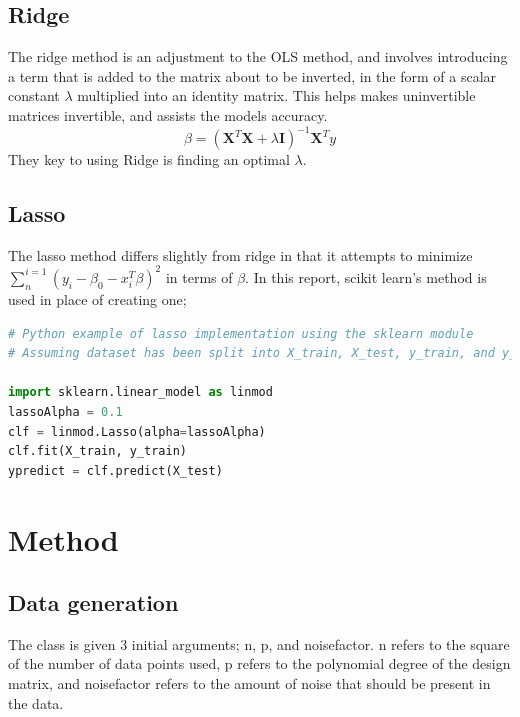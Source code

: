 \documentclass[a4paper, UKenglish]{article}
\newcommand{\0}{\mathbf{0}}
\newcommand{\1}{\mathbf{1}}
\begin{document}
\subsection{Ridge}
The ridge method is an adjustment to the OLS method, and involves introducing a term that is added to the matrix about to be inverted, in the form of a scalar constant $\lambda$ multiplied into an identity matrix. This helps makes uninvertible matrices invertible, and assists the models accuracy. 
$$\beta = \left(\textbf{X}^T\textbf{X} + \lambda \textbf{I}\right)^{-1} \textbf{X}^T y $$
They key to using Ridge is finding an optimal $\lambda$.

\subsection{Lasso}
The lasso method differs slightly from ridge in that it attempts to minimize $\displaystyle\sum_{n}^{i=1} \left( y_i - \beta_0 - x_i^T\beta  \right)^2$ in terms of $\beta$. In this report, scikit learn's method is used in place of creating one; 

\begin{lstlisting}[language=Python]
# Python example of lasso implementation using the sklearn module
# Assuming dataset has been split into X_train, X_test, y_train, and y_test

import sklearn.linear_model as linmod
lassoAlpha = 0.1
clf = linmod.Lasso(alpha=lassoAlpha)
clf.fit(X_train, y_train)
ypredict = clf.predict(X_test)
\end{lstlisting}

\section{Method}
\subsection{Data generation} \label{sec: dataGen}
The class is given 3 initial arguments; n, p, and noisefactor. n refers to the square of the number of data points used, p refers to the polynomial degree of the design matrix, and noisefactor refers to the amount of noise that should be present in the data.
\end{document}
